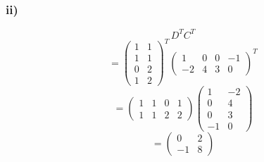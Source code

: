         \subsubsection{ii)}            
            $$D^TC^T$$
            $$=
            \begin{pmatrix}
                1 & 1\\
                1 & 1\\
                0 & 2\\
                1 & 2
            \end{pmatrix}^T
            \begin{pmatrix}
                1 & 0 & 0 & -1\\
                -2 & 4 & 3 & 0
            \end{pmatrix}^T$$
            $$=
            \begin{pmatrix}
                1 & 1 & 0 & 1 \\
                1 & 1 & 2 & 2
            \end{pmatrix}
            \begin{pmatrix}
                1 & -2 \\
                0 & 4\\
                0 & 3\\
                -1 & 0
            \end{pmatrix}$$
            $$= \begin{pmatrix}
                0 & 2\\
                -1 & 8
            \end{pmatrix}$$
            